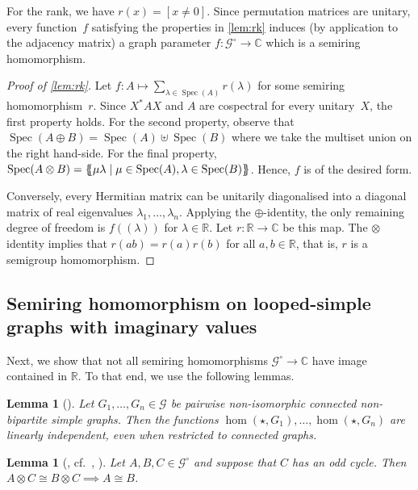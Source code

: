 \documentclass[11pt]{scrartcl}
\theoremstyle{definition}
\theoremstyle{plain}
\newtheorem{lemma}[definition]{Lemma}
\theoremstyle{remark}
\DeclareMathOperator{\Spec}{Spec}
\DeclarePairedDelimiter{\multiset}{\{\!\!\{}{\}\!\!\}}
\newcommand{\lG}{\mathcal{G}^\circ}
\newcommand{\G}{\mathcal{G}}
\newcommand{\C}{\mathbb{C}}
\newcommand{\R}{\mathbb{R}}
\begin{document}
    For the rank, we have $r(x) = [x \neq 0]$.
    Since permutation matrices are unitary, every function~$f$ satisfying the properties in \cref{lem:rk} induces (by application to the adjacency matrix) a graph parameter $f \colon \lG \to \mathbb{C}$ which is a semiring homomorphism.
     
	\begin{proof}[Proof of \cref{lem:rk}]
        Let $f \colon A \mapsto \sum_{\lambda \in \Spec(A)} r(\lambda)$ for some semiring homomorphism~$r$.
        Since $X^* A X$ and $A$ are cospectral for every unitary~$X$, the first property holds.
        For the second property, observe that $\Spec(A \oplus B) = \Spec(A) \uplus \Spec(B)$ where we take the multiset union on the right hand-side.
        For the final property, $\Spec(A \otimes B) =\multiset{\mu\lambda \mid \mu \in \Spec(A), \lambda \in \Spec(B)}$.
        Hence, $f$ is of the desired form.

        Conversely,
		every Hermitian matrix can be unitarily diagonalised
		into a diagonal matrix of real eigenvalues $\lambda_1, \dots, \lambda_n$.
		Applying the $\oplus$-identity, the only remaining degree of freedom is $f( (\lambda) )$ for $\lambda \in \mathbb{R}$.
		Let $r \colon \mathbb{R} \to \mathbb{C}$ be this map. 
		The $\otimes$ identity implies that $r(ab) = r(a) r(b)$ for all $a,b \in \mathbb{R}$, that is, $r$ is a semigroup homomorphism.
	\end{proof}
	

\subsection{Semiring homomorphism on looped-simple graphs with imaginary values}

Next, we show that not all semiring homomorphisms $\lG \to \C$ have image contained in $\R$.
	To that end, we use the following lemmas.

	\begin{lemma}[{\cite[Exercise~5.52]{lovasz_large_2012}}]\label{lem:lov5.52}
		Let $G_1, \dots, G_n \in \G$ be pairwise non-isomorphic connected non-bipartite simple graphs.
		Then the functions $\hom(\star, G_1), \dots, \hom(\star, G_n)$ are linearly independent, even when restricted to connected graphs.
	\end{lemma}

    \begin{lemma}[\textcite{lovasz_cancellation_1971}, cf.\ {\cite[Theorem~9.10]{hammack_handbook_2011}, \cite[Theorem 5.37]{lovasz_large_2012}}]\label{lem:lovasz-cancellation}
        Let $A, B, C \in \lG$
        and suppose that $C$ has an odd cycle.
        Then $A \otimes C \cong B \otimes C \implies A \cong B$.
    \end{lemma}
\end{document}
